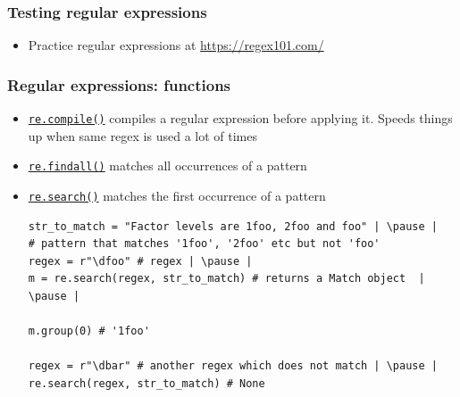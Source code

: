 \documentclass[xcolor=table]{beamer}
\begin{document}
\begin{frame}[fragile]
    \frametitle{Testing regular expressions}
        \begin{itemize}
            \item Practice regular expressions at \url{https://regex101.com/} 
                \begin{center}
                \end{center}
        \end{itemize}
\end{frame}


\begin{frame}[fragile]
\frametitle{Regular expressions: functions}
    \begin{itemize}
        \item \href{https://docs.python.org/3.7/library/re.html#re.compile}{\texttt{re.compile()}} compiles a regular expression before applying it. Speeds things up when same regex is used a lot of times \pause
        \item \href{https://docs.python.org/3.7/library/re.html#re.findall}{\texttt{re.findall()}} matches all occurrences of a pattern \pause
        \item \href{https://docs.python.org/3.7/library/re.html#re.search}{\texttt{re.search()}} matches the first occurrence of a pattern
\begin{lstlisting}[style=python,belowskip=-1 \baselineskip]
str_to_match = "Factor levels are 1foo, 2foo and foo" | \pause |
# pattern that matches '1foo', '2foo' etc but not 'foo'
regex = r"\dfoo" # regex | \pause |  
m = re.search(regex, str_to_match) # returns a Match object  | \pause |

m.group(0) # '1foo'

regex = r"\dbar" # another regex which does not match | \pause |  
re.search(regex, str_to_match) # None
\end{lstlisting}
    \end{itemize}
\end{frame}
\end{document}
